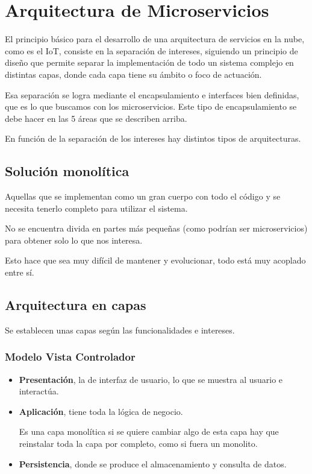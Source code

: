 \documentclass[12pt, twoside, openright]{report} %
\begin{document}
\section{Arquitectura de Microservicios}

El principio básico para el desarrollo de una arquitectura de servicios en la nube, como es el IoT, consiste en la separación de intereses, siguiendo un principio de diseño que permite separar la implementación de todo un sistema complejo en distintas capas, donde cada capa tiene su ámbito o foco de actuación.

Esa separación se logra mediante el encapsulamiento e interfaces bien definidas, que es lo que buscamos con los microservicios.
Este tipo de encapsulamiento se debe hacer en las 5 áreas que se describen arriba.

En función de la separación de los intereses hay distintos tipos de arquitecturas.

\subsection{Solución monolítica}
Aquellas que se implementan como un gran cuerpo con todo el código y se necesita tenerlo completo para utilizar el sistema.

No se encuentra divida en partes más pequeñas (como podrían ser microservicios) para obtener solo lo que nos interesa.

Esto hace que sea muy difícil de mantener y evolucionar, todo está muy acoplado entre sí.

\subsection{Arquitectura en capas}
Se establecen unas capas según las funcionalidades e intereses.

\subsubsection{Modelo Vista Controlador}
\begin{itemize}
	\item \textbf{Presentación}, la de interfaz de usuario, lo que se muestra al usuario e interactúa.
	\item \textbf{Aplicación}, tiene toda la lógica de negocio.

	      Es una capa monolítica si se quiere cambiar algo de esta capa hay que reinstalar toda la capa por completo, como si fuera un monolito.

	\item \textbf{Persistencia}, donde se produce el almacenamiento y consulta de datos.
\end{itemize}
\end{document}
